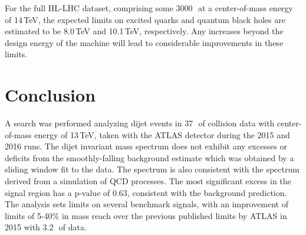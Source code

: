 For the full HL-LHC dataset, comprising some 3000\,\ifb~at a center-of-mass energy of 14\,TeV, the expected limits on excited quarks and quantum black holes are estimated to be 8.0\,TeV and 10.1\,TeV, respectively. \cite{DijetOutlook}  Any increases beyond the design energy of the machine will lead to considerable improvements in these limits.

\section{Conclusion}

A search was performed analyzing dijet events in 37\,\ifb~of collision data with center-of-mass energy of 13\,TeV, taken with the ATLAS detector during the 2015 and 2016 runs.  The dijet invariant mass spectrum does not exhibit any excesses or deficits from the smoothly-falling background estimate which was obtained by a sliding window fit to the data.  The spectrum is also consistent with the spectrum derived from a simulation of QCD processes.  The most significant excess in the signal region has a p-value of 0.63, consistent with the background prediction.  The analysis sets limits on several benchmark signals, with an improvement of limits of 5-40\% in mass reach over the previous published limits by ATLAS in 2015 with 3.2\,\ifb~of data.


